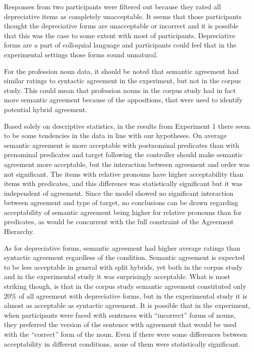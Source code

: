 Responses from two participants were filtered out because they rated all depreciative items as completely unacceptable. It seems that those participants thought the depreciative forms are unacceptable or incorrect and it is possible that this was the case to some extent with most of participants. Depreciative forms are a part of colloquial language and participants could feel that in the experimental settings those forms sound unnatural.

For the profession noun data, it should be noted that semantic agreement had similar ratings to syntactic agreement in the experiment, but not in the corpus study. This could mean that profession nouns in the corpus study had in fact more semantic agreement because of the appositions, that were used to identify potential hybrid agreement.

Based solely on descriptive statistics, in the results from Experiment 1 there seem to be some tendencies in the data in line with our hypotheses. On average semantic agreement is more acceptable with postnominal predicates than with prenominal predicates and target following the controller should make semantic agreement more acceptable, but the interaction between agreement and order was not significant. The items with relative pronouns have higher acceptability than items with predicates, and this difference was statistically significant but it was independent of agreement. Since the model showed no significant interaction between agreement and type of target, no conclusions can be drawn regarding acceptability of semantic agreement being higher for relative pronouns than for predicates, as would be concurrent with the full constraint of the Agreement Hierarchy.

As for depreciative forms, semantic agreement had higher average ratings than syntactic agreement regardless of the condition. Semantic agreement is expected to be less acceptable in general with split hybrids, yet both in the corpus study and in the experimental study it was surprisingly acceptable. What is most striking though, is that in the corpus study semantic agreement constituted only 20\% of all agreement with depreciative forms, but in the experimental study it is almost as acceptable as syntactic agreement. It is possible that in the experiment, when participants were faced with sentences with ``incorrect'' forms of nouns, they preferred the version of the sentence with agreement that would be used with the ``correct'' form of the noun. Even if there were some differences between acceptability in different conditions, none of them were statistically significant.

